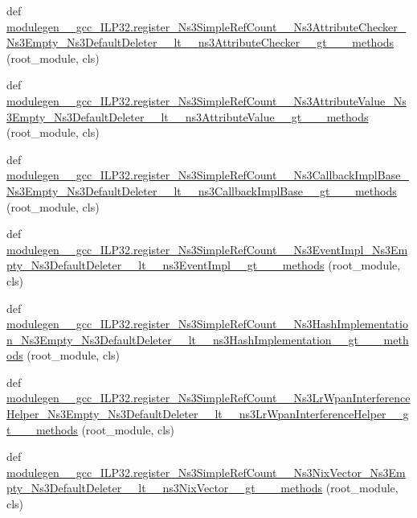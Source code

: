 \begin{DoxyCompactItemize}
\item 
def \hyperlink{namespacemodulegen____gcc__ILP32_a8e35760026d969bed52bf02d5751f184}{modulegen\+\_\+\+\_\+gcc\+\_\+\+I\+L\+P32.\+register\+\_\+\+Ns3\+Simple\+Ref\+Count\+\_\+\+\_\+\+Ns3\+Attribute\+Checker\+\_\+\+Ns3\+Empty\+\_\+\+Ns3\+Default\+Deleter\+\_\+\+\_\+lt\+\_\+\+\_\+ns3\+Attribute\+Checker\+\_\+\+\_\+gt\+\_\+\+\_\+\+\_\+methods} (root\+\_\+module, cls)
\item 
def \hyperlink{namespacemodulegen____gcc__ILP32_ae37f0969d06fd5e11e962c9b2a58d222}{modulegen\+\_\+\+\_\+gcc\+\_\+\+I\+L\+P32.\+register\+\_\+\+Ns3\+Simple\+Ref\+Count\+\_\+\+\_\+\+Ns3\+Attribute\+Value\+\_\+\+Ns3\+Empty\+\_\+\+Ns3\+Default\+Deleter\+\_\+\+\_\+lt\+\_\+\+\_\+ns3\+Attribute\+Value\+\_\+\+\_\+gt\+\_\+\+\_\+\+\_\+methods} (root\+\_\+module, cls)
\item 
def \hyperlink{namespacemodulegen____gcc__ILP32_a1725745354fc64e505a347b59ad09428}{modulegen\+\_\+\+\_\+gcc\+\_\+\+I\+L\+P32.\+register\+\_\+\+Ns3\+Simple\+Ref\+Count\+\_\+\+\_\+\+Ns3\+Callback\+Impl\+Base\+\_\+\+Ns3\+Empty\+\_\+\+Ns3\+Default\+Deleter\+\_\+\+\_\+lt\+\_\+\+\_\+ns3\+Callback\+Impl\+Base\+\_\+\+\_\+gt\+\_\+\+\_\+\+\_\+methods} (root\+\_\+module, cls)
\item 
def \hyperlink{namespacemodulegen____gcc__ILP32_a8101c8d46fb3608fb9b8e22e680f1793}{modulegen\+\_\+\+\_\+gcc\+\_\+\+I\+L\+P32.\+register\+\_\+\+Ns3\+Simple\+Ref\+Count\+\_\+\+\_\+\+Ns3\+Event\+Impl\+\_\+\+Ns3\+Empty\+\_\+\+Ns3\+Default\+Deleter\+\_\+\+\_\+lt\+\_\+\+\_\+ns3\+Event\+Impl\+\_\+\+\_\+gt\+\_\+\+\_\+\+\_\+methods} (root\+\_\+module, cls)
\item 
def \hyperlink{namespacemodulegen____gcc__ILP32_a59dad6cf46a3eb90ab74f8388a4708b9}{modulegen\+\_\+\+\_\+gcc\+\_\+\+I\+L\+P32.\+register\+\_\+\+Ns3\+Simple\+Ref\+Count\+\_\+\+\_\+\+Ns3\+Hash\+Implementation\+\_\+\+Ns3\+Empty\+\_\+\+Ns3\+Default\+Deleter\+\_\+\+\_\+lt\+\_\+\+\_\+ns3\+Hash\+Implementation\+\_\+\+\_\+gt\+\_\+\+\_\+\+\_\+methods} (root\+\_\+module, cls)
\item 
def \hyperlink{namespacemodulegen____gcc__ILP32_acfd48c62ea64872d866bbe24ec4ee290}{modulegen\+\_\+\+\_\+gcc\+\_\+\+I\+L\+P32.\+register\+\_\+\+Ns3\+Simple\+Ref\+Count\+\_\+\+\_\+\+Ns3\+Lr\+Wpan\+Interference\+Helper\+\_\+\+Ns3\+Empty\+\_\+\+Ns3\+Default\+Deleter\+\_\+\+\_\+lt\+\_\+\+\_\+ns3\+Lr\+Wpan\+Interference\+Helper\+\_\+\+\_\+gt\+\_\+\+\_\+\+\_\+methods} (root\+\_\+module, cls)
\item 
def \hyperlink{namespacemodulegen____gcc__ILP32_acf2fe3353b3614ad36d5edc27d55dc08}{modulegen\+\_\+\+\_\+gcc\+\_\+\+I\+L\+P32.\+register\+\_\+\+Ns3\+Simple\+Ref\+Count\+\_\+\+\_\+\+Ns3\+Nix\+Vector\+\_\+\+Ns3\+Empty\+\_\+\+Ns3\+Default\+Deleter\+\_\+\+\_\+lt\+\_\+\+\_\+ns3\+Nix\+Vector\+\_\+\+\_\+gt\+\_\+\+\_\+\+\_\+methods} (root\+\_\+module, cls)

\end{DoxyCompactItemize}
